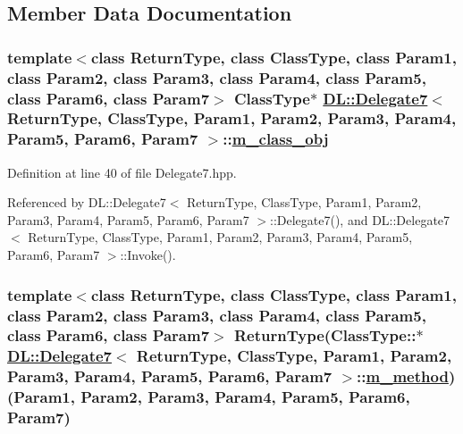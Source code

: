 \subsection{Member Data Documentation}
\hypertarget{classDL_1_1Delegate7_r0}{
\subsubsection[m\_\-class\_\-obj]{\setlength{\rightskip}{0pt plus 5cm}template$<$class Return\-Type, class Class\-Type, class Param1, class Param2, class Param3, class Param4, class Param5, class Param6, class Param7$>$ Class\-Type$\ast$ \hyperlink{classDL_1_1Delegate7}{DL::Delegate7}$<$ Return\-Type, Class\-Type, Param1, Param2, Param3, Param4, Param5, Param6, Param7 $>$::\hyperlink{classDL_1_1Delegate7_r0}{m\_\-class\_\-obj}}}
\label{classDL_1_1Delegate7_r0}




Definition at line 40 of file Delegate7.hpp.

Referenced by DL::Delegate7$<$ Return\-Type, Class\-Type, Param1, Param2, Param3, Param4, Param5, Param6, Param7 $>$::Delegate7(), and DL::Delegate7$<$ Return\-Type, Class\-Type, Param1, Param2, Param3, Param4, Param5, Param6, Param7 $>$::Invoke().\hypertarget{classDL_1_1Delegate7_r1}{
\subsubsection[m\_\-method]{\setlength{\rightskip}{0pt plus 5cm}template$<$class Return\-Type, class Class\-Type, class Param1, class Param2, class Param3, class Param4, class Param5, class Param6, class Param7$>$ Return\-Type(Class\-Type::$\ast$ \hyperlink{classDL_1_1Delegate7}{DL::Delegate7}$<$ Return\-Type, Class\-Type, Param1, Param2, Param3, Param4, Param5, Param6, Param7 $>$::\hyperlink{classDL_1_1Delegate7_r1}{m\_\-method})(Param1, Param2, Param3, Param4, Param5, Param6, Param7)}}
\label{classDL_1_1Delegate7_r1}




